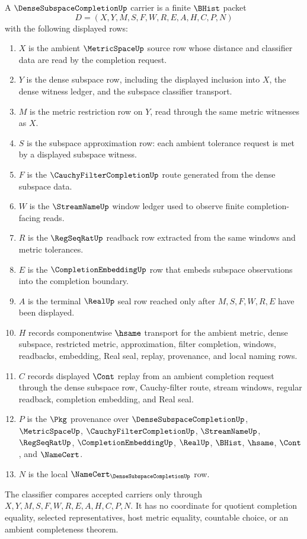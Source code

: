 \begin{definition}
\label{def:dense-subspace-completion-carrier}
A $\DenseSubspaceCompletionUp$ carrier is a finite $\BHist$ packet
$$
D=(X,Y,M,S,F,W,R,E,A,H,C,P,N)
$$
with the following displayed rows:
\begin{enumerate}
\item $X$ is the ambient $\MetricSpaceUp$ source row whose distance and classifier data are read by the completion request.
\item $Y$ is the dense subspace row, including the displayed inclusion into $X$, the dense witness ledger, and the subspace classifier transport.
\item $M$ is the metric restriction row on $Y$, read through the same metric witnesses as $X$.
\item $S$ is the subspace approximation row: each ambient tolerance request is met by a displayed subspace witness.
\item $F$ is the $\CauchyFilterCompletionUp$ route generated from the dense subspace data.
\item $W$ is the $\StreamNameUp$ window ledger used to observe finite completion-facing reads.
\item $R$ is the $\RegSeqRatUp$ readback row extracted from the same windows and metric tolerances.
\item $E$ is the $\CompletionEmbeddingUp$ row that embeds subspace observations into the completion boundary.
\item $A$ is the terminal $\RealUp$ seal row reached only after $M,S,F,W,R,E$ have been displayed.
\item $H$ records componentwise $\hsame$ transport for the ambient metric, dense subspace, restricted metric, approximation, filter completion, windows, readbacks, embedding, Real seal, replay, provenance, and local naming rows.
\item $C$ records displayed $\Cont$ replay from an ambient completion request through the dense subspace row, Cauchy-filter route, stream windows, regular readback, completion embedding, and Real seal.
\item $P$ is the $\Pkg$ provenance over $\DenseSubspaceCompletionUp$, $\MetricSpaceUp$, $\CauchyFilterCompletionUp$, $\StreamNameUp$, $\RegSeqRatUp$, $\CompletionEmbeddingUp$, $\RealUp$, $\BHist$, $\hsame$, $\Cont$, and $\NameCert$.
\item $N$ is the local $\NameCert_{\DenseSubspaceCompletionUp}$ row.
\end{enumerate}
The classifier compares accepted carriers only through $X,Y,M,S,F,W,R,E,A,H,C,P,N$. It has no coordinate for quotient completion equality, selected representatives, host metric equality, countable choice, or an ambient completeness theorem.
\end{definition}

